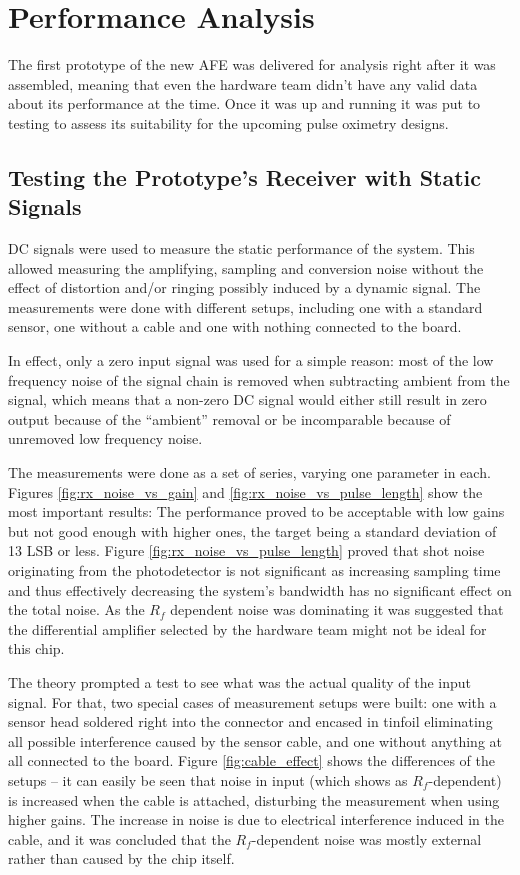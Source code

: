 \clearpage
\section{Performance Analysis}\label{section:performance_analysis}

The first prototype of the new AFE was delivered for analysis right after it was assembled, meaning that even the hardware team didn't have any valid data about its performance at the time. Once it was up and running it was put to testing to assess its suitability for the upcoming pulse oximetry designs.

\subsection{Testing the Prototype's Receiver with Static Signals}

DC signals were used to measure the static performance of the system. This allowed measuring the amplifying, sampling and conversion noise without the effect of distortion and/or ringing possibly induced by a dynamic signal. The measurements were done with different setups, including one with a standard sensor, one without a cable and one with nothing connected to the board.

In effect, only a zero input signal was used for a simple reason: most of the low frequency noise of the signal chain is removed when subtracting ambient from the signal, which means that a non-zero DC signal would either still result in zero output because of the ``ambient'' removal or be incomparable because of unremoved low frequency noise.

The measurements were done as a set of series, varying one parameter in each. Figures \ref{fig:rx_noise_vs_gain} and \ref{fig:rx_noise_vs_pulse_length} show the most important results: The performance proved to be acceptable with low gains but not good enough with higher ones, the target being a standard deviation of 13 LSB or less. Figure \ref{fig:rx_noise_vs_pulse_length} proved that shot noise originating from the photodetector is not significant as increasing sampling time and thus effectively decreasing the system's bandwidth has no significant effect on the total noise. As the $R_f$ dependent noise was dominating it was suggested that the differential amplifier selected by the hardware team might not be ideal for this chip.

The theory prompted a test to see what was the actual quality of the input signal. For that, two special cases of measurement setups were built: one with a sensor head soldered right into the connector and encased in tinfoil eliminating all possible interference caused by the sensor cable, and one without anything at all connected to the board. Figure \ref{fig:cable_effect} shows the differences of the setups -- it can easily be seen that noise in input (which shows as $R_f$-dependent) is increased when the cable is attached, disturbing the measurement when using higher gains. The increase in noise is due to electrical interference induced in the cable, and it was concluded that the $R_f$-dependent noise was mostly external rather than caused by the chip itself.

